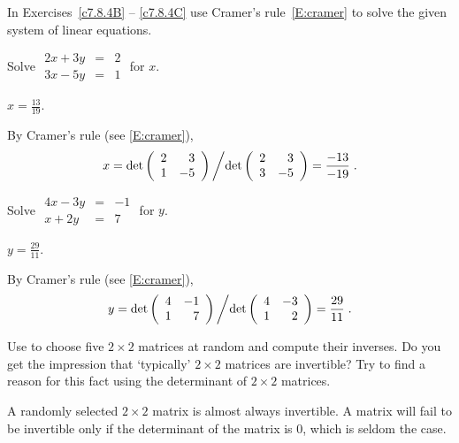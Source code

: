 \documentclass{ximera}
\begin{document}
\noindent In Exercises~\ref{c7.8.4B} -- \ref{c7.8.4C} use Cramer's 
rule~\eqref{E:cramer} to solve the given system of linear 
equations.
\begin{exercise} \label{c7.8.4B}
Solve \qquad $\begin{array}{rcl} 2x+3y & = & 2 \\ 3x - 5y & = & 1 \end{array}$ 
\qquad for $x$.

\begin{solution}
\ans  $x=\frac{13}{19}$.

\soln By Cramer's rule (see \eqref{E:cramer}),
\[
x = \det\left(\begin{array}{rr} 2 & 3\\ 1 &-5\end{array}\right)\left/\det\left(\begin{array}{rr} 2 & 3\\ 3 &-5\end{array}\right)=\frac{-13}{-19}\right..
\]
 

\end{solution}
\end{exercise} 
\begin{exercise} \label{c7.8.4C}
Solve \qquad
$\begin{array}{rcl} 4x-3y & = & -1 \\ x + 2y & = & 7 \end{array}$ 
\qquad for $y$.

\begin{solution}
\ans  $y=\frac{29}{11}$.

\soln By Cramer's rule (see \eqref{E:cramer}),
\[
y = \det\left(\begin{array}{rr} 4 & -1\\ 1 &7\end{array}\right)\left/\det\left(\begin{array}{rr} 4 & -3\\ 1 &2\end{array}\right)=\frac{29}{11}\right..
\]

\end{solution}
\end{exercise}

\CEXER

\begin{exercise} \label{c4.9.9}
Use \Matlab to choose five $2\times 2$ matrices at random and compute
their inverses.  Do you get the impression that `typically'
$2\times 2$ matrices are invertible?  Try to find a reason for
this fact using the determinant of $2\times 2$ matrices.

\begin{solution}

A randomly selected $2 \times 2$ matrix is almost always invertible.
A matrix will fail to be invertible only if the determinant of the
matrix is $0$, which is seldom the case.

\end{solution}
\end{exercise}
\end{document}
